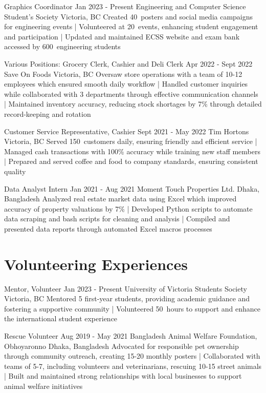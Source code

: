 \documentclass[a4paper,10pt]{article}
\begin{document}
\relevantexperience
{Graphics Coordinator}
{Jan 2023 - Present}
{Engineering and Computer Science Student’s Society}
{Victoria, BC}
{Created 40\plus\ posters and social media campaigns for engineering events 
| Volunteered at 20\plus\ events, enhancing student engagement and participation 
| Updated and maintained ECSS website and exam bank accessed by 600\plus\ engineering students
}

\relevantexperience
{Various Positions: Grocery Clerk, Cashier and Deli Clerk}
{Apr 2022 - Sept 2022}
{Save On Foods}
{Victoria, BC}
{Oversaw store operations with a team of 10-12 employees which ensured smooth daily workflow 
| Handled customer inquiries while collaborated with 3 departments through effective communication channels 
| Maintained inventory accuracy, reducing stock shortages by 7\% through detailed record-keeping and rotation
}

\relevantexperience
{Customer Service Representative, Cashier}
{Sept 2021 - May 2022}
{Tim Hortons}
{Victoria, BC}
{Served 150\plus\ customers daily, ensuring friendly and efficient service 
| Managed cash transactions with 100\% accuracy while training new staff members 
| Prepared and served coffee and food to company standards, ensuring consistent quality
}

\relevantexperience
{Data Analyst Intern}
{Jan 2021 - Aug 2021}
{Moment Touch Properties Ltd.}
{Dhaka, Bangladesh}
{Analyzed real estate market data using Excel which improved accuracy of property valuations by 7\% 
| Developed Python scripts to automate data scraping and bash scripts for cleaning and analysis
| Compiled and presented data reports through automated Excel macros processes
}

\section{Volunteering Experiences}

\relevantexperience
{Mentor, Volunteer}
{Jan 2023 - Present}
{University of Victoria Students Society}
{Victoria, BC}
{Mentored 5 first-year students, providing academic guidance and fostering a supportive community
| Volunteered 50\plus\ hours to support and enhance the international student experience 
}

\relevantexperience
{Rescue Volunteer}
{Aug 2019 - May 2021}
{Bangladesh Animal Welfare Foundation, Obhoyaronno}
{Dhaka, Bangladesh}
{Advocated for responsible pet ownership through community outreach, creating 15-20 monthly posters 
| Collaborated with teams of 5-7, including volunteers and veterinarians, rescuing 10-15 street animals 
| Built and maintained strong relationships with local businesses to support animal welfare initiatives
}
\end{document}
